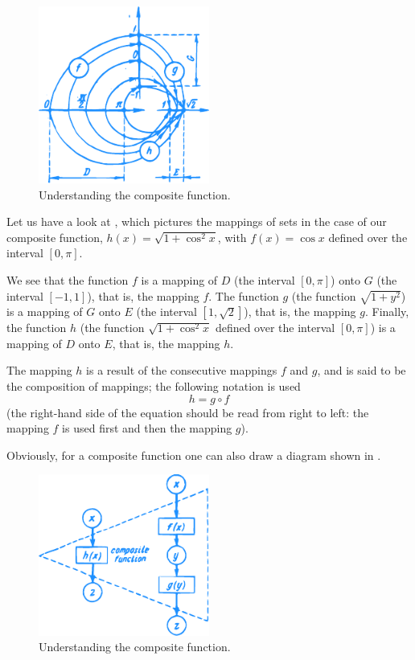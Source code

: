{\begin{figure}[!ht]%
\centering
\includegraphics[width=0.5\textwidth]{figures/fig-21.pdf}
\caption{Understanding the composite function.}
\label{fig-21}
\end{figure}

\athr Let us have a look at , which pictures the mappings of sets in the case of our composite function, $h (x) =\sqrt{1 + \cos^{2} x}$, with $f(x) = \cos x$ defined over the interval $[0, \pi]$.

We see that the function $f$ is a mapping of $D$ (the interval $[0, \pi]$) onto $G$ (the interval $[-1, 1]$), that is, the mapping $f$. The function $g$ (the function $\sqrt{1 + y^{2}}$) is a mapping of $G$ onto $E$ (the interval $[1, \sqrt{2}]$), that is, the mapping $g$. Finally, the function $h$ (the function $\sqrt{1 + \cos^{2} x}$ defined over the interval $[0, \pi]$) is a mapping of $D$ onto $E$, that is, the mapping $h$.

The mapping $h$ is a result of the consecutive mappings $f$ and $g$, and is said to be the composition of mappings; the following notation is used
\begin{equation*}%
h = g \circ f
\end{equation*}
(the right-hand side of the equation should be read from right to left: the mapping $f$ is used first and then the mapping $g$).

\rdr Obviously, for a composite function one can also draw a diagram shown in .

\begin{figure}[!ht]%
\centering
\includegraphics[width=0.5\textwidth]{figures/fig-22.pdf}
\caption{Understanding the composite function.}
\label{fig-22}
\end{figure}


}
